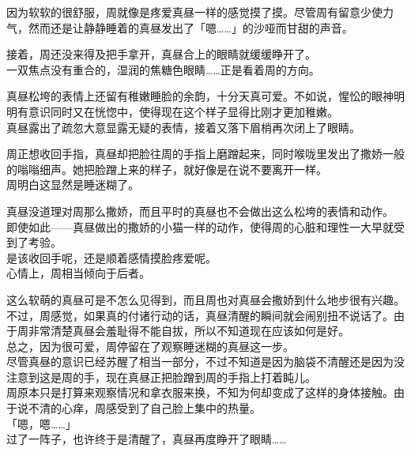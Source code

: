 因为软软的很舒服，周就像是疼爱真昼一样的感觉摸了摸。尽管周有留意少使力气，然而还是让静静睡着的真昼发出了「嗯……」的沙哑而甘甜的声音。

接着，周还没来得及把手拿开，真昼合上的眼睛就缓缓睁开了。\\

一双焦点没有重合的，湿润的焦糖色眼睛……正是看着周的方向。

真昼松垮的表情上还留有稚嫩睡脸的余韵，十分天真可爱。不如说，惺忪的眼神明明有意识同时又在恍惚中，使得现在这个样子显得比刚才更加稚嫩。\\

真昼露出了疏忽大意显露无疑的表情，接着又落下眉梢再次闭上了眼睛。

周正想收回手指，真昼却把脸往周的手指上磨蹭起来，同时喉咙里发出了撒娇一般的嗡嗡细声。她把脸蹭上来的样子，就好像是在说不要离开一样。\\

周明白这显然是睡迷糊了。

真昼没道理对周那么撒娇，而且平时的真昼也不会做出这么松垮的表情和动作。\\

即使如此——真昼做出的撒娇的小猫一样的动作，使得周的心脏和理性一大早就受到了考验。\\

是该收回手呢，还是顺着感情摸脸疼爱呢。\\

心情上，周相当倾向于后者。

这么软萌的真昼可是不怎么见得到，而且周也对真昼会撒娇到什么地步很有兴趣。\\

不过，周感觉，如果真的付诸行动的话，真昼清醒的瞬间就会闹别扭不说话了。由于周非常清楚真昼会羞耻得不能自拔，所以不知道现在应该如何是好。\\

总之，因为很可爱，周停留在了观察睡迷糊的真昼这一步。\\

尽管真昼的意识已经苏醒了相当一部分，不过不知道是因为脑袋不清醒还是因为没注意到这是周的手，现在真昼正把脸蹭到周的手指上打着盹儿。\\

周原本只是打算来观察情况和拿衣服来换，不知为何却变成了这样的身体接触。由于说不清的心痒，周感受到了自己脸上集中的热量。\\

「嗯，嗯……」\\

过了一阵子，也许终于是清醒了，真昼再度睁开了眼睛……\\


